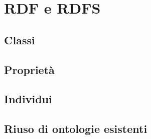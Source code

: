 \section{RDF e RDFS}

\subsection{Classi}

\subsection{Proprietà}

\subsection{Individui}

\subsection{Riuso di ontologie esistenti}
